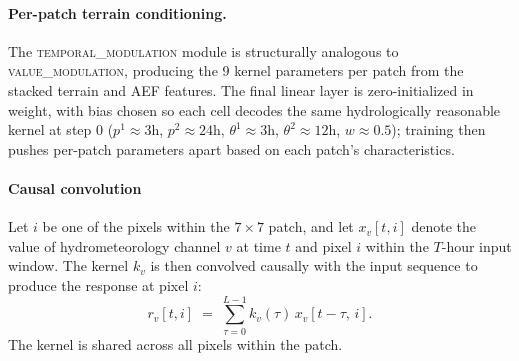 \paragraph{Per-patch terrain conditioning.}
The \textsc{temporal\_modulation} module is structurally analogous to \textsc{value\_modulation}, producing the 9 kernel parameters per patch from the stacked terrain and AEF features.
%
%
The final linear layer is zero-initialized in weight, with bias chosen so each cell decodes the same hydrologically reasonable kernel at step 0 ($p^{\text{1}} \approx 3$h, $p^{\text{2}} \approx 24$h, $\theta^{\text{1}} \approx 3$h, $\theta^{\text{2}} \approx 12$h, $w \approx 0.5$); training then pushes per-patch parameters apart based on each patch's characteristics.

\paragraph{Causal convolution}
Let $i$ be one of the pixels within the $7 \times 7$ patch, and let $x_v[t, i]$ denote the value of hydrometeorology channel $v$ at time $t$ and pixel $i$ within the $T$-hour input window. The kernel $k_v$ is then convolved causally with the input sequence to produce the response at pixel $i$: \[r_v[t, i] \;=\; \sum_{\tau=0}^{L-1} k_v(\tau)\, x_v[t - \tau,\, i].\]
The kernel is shared across all pixels within the patch.
%
